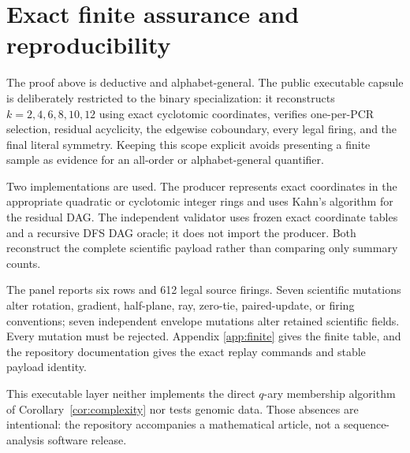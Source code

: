 \section{Exact finite assurance and reproducibility}
\label{sec:validation}

The proof above is deductive and alphabet-general.  The public executable
capsule is deliberately restricted to the binary specialization: it
reconstructs $k=2,4,6,8,10,12$ using exact cyclotomic
coordinates, verifies one-per-PCR selection, residual acyclicity, the
edgewise coboundary, every legal firing, and the final literal symmetry.
Keeping this scope explicit avoids presenting a finite sample as evidence for
an all-order or alphabet-general quantifier.

Two implementations are used.  The producer represents exact coordinates in
the appropriate quadratic or cyclotomic integer rings and uses Kahn's
algorithm for the residual DAG.  The independent validator uses frozen exact
coordinate tables and a recursive DFS DAG oracle; it does not import the
producer.  Both reconstruct the complete scientific payload rather than
comparing only summary counts.

The panel reports six rows and 612 legal source firings.  Seven scientific
mutations alter rotation, gradient, half-plane, ray, zero-tie, paired-update,
or firing conventions; seven independent envelope mutations alter retained
scientific fields.  Every mutation must be rejected.  Appendix
\ref{app:finite} gives the finite table, and the repository documentation
gives the exact replay commands and stable payload identity.

This executable layer neither implements the direct $q$-ary membership
algorithm of Corollary~\ref{cor:complexity} nor tests genomic data.  Those
absences are intentional: the repository accompanies a mathematical article,
not a sequence-analysis software release.
